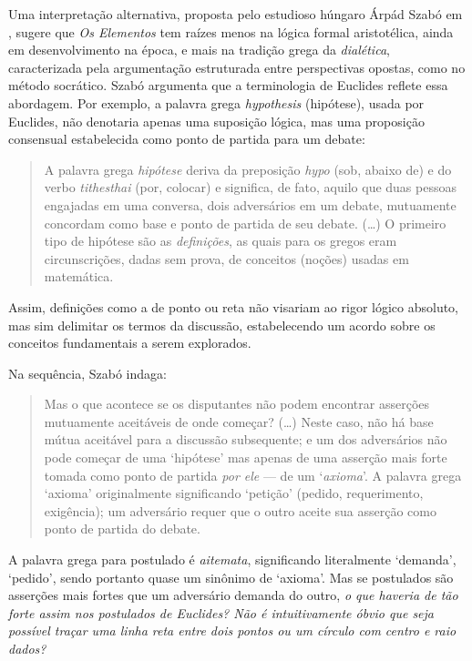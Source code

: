 \documentclass{hipatia}
\begin{document}
Uma interpretação alternativa, proposta pelo
estudioso húngaro Árpád Szabó em \cite{szabo1967},
sugere que \emph{Os Elementos} tem
raízes menos na lógica formal aristotélica, ainda em
desenvolvimento na época, e mais na tradição grega da 
\emph{dialética}, caracterizada pela argumentação estruturada entre
perspectivas opostas, como no método socrático. Szabó
argumenta que a terminologia de Euclides reflete essa
abordagem. Por exemplo, a palavra grega \emph{hypothesis}
(hipótese), usada por Euclides, não denotaria apenas uma
suposição lógica, mas uma proposição consensual estabelecida
como ponto de partida para um debate: 
\begin{quote}
	A palavra grega \emph{hipótese} deriva da preposição
	\emph{hypo} (sob, abaixo de) e do verbo \emph{tithesthai}
	(por, colocar) e significa, de fato, aquilo que
	duas pessoas engajadas em uma conversa, dois 
	adversários em um debate, mutuamente concordam como
	base e ponto de partida de seu debate. (\dots)
	O primeiro tipo de hipótese são as \emph{definições},
	as quais para os gregos eram circunscrições, dadas sem
	prova, de conceitos (noções) usadas em matemática.
	\cite{szabo1967}
\end{quote}
Assim, definições como
a de ponto ou reta não visariam ao rigor lógico absoluto, mas
sim delimitar os termos da discussão, estabelecendo um
acordo sobre os conceitos fundamentais a serem explorados.

Na sequência, Szabó indaga:
\begin{quote}
	Mas o que acontece se os disputantes não podem
	encontrar asserções mutuamente aceitáveis
	de onde começar? (\dots) Neste caso, não há 
	base mútua aceitável para a discussão 
	subsequente; e um dos adversários não pode começar
	de uma `hipótese' mas apenas de uma asserção
	mais forte tomada como ponto de partida \emph{por ele}
	--- de um `\emph{axioma}'. A palavra grega
	`axioma' originalmente significando `petição' 
	(pedido, requerimento, exigência); um adversário
	requer que o outro aceite sua asserção como 
	ponto de partida do debate.
\end{quote}
A palavra grega para postulado é \emph{aitemata},
significando literalmente `demanda', `pedido',
sendo portanto quase um sinônimo de `axioma'.
Mas se postulados são asserções mais fortes que 
um adversário demanda do outro, \emph{o que haveria
de tão forte assim nos postulados de Euclides?
Não é intuitivamente óbvio que seja possível
traçar uma linha reta entre dois pontos ou
um círculo com centro e raio dados?} 
\end{document}
